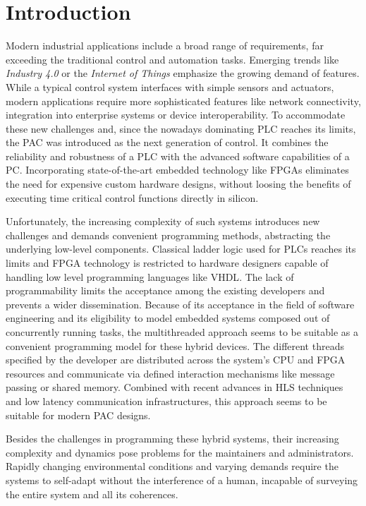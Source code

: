 \chapter{Introduction}

Modern industrial applications include a broad range of requirements, far
exceeding the traditional control and automation tasks. Emerging trends like
\emph{Industry 4.0} or the \emph{Internet of Things} emphasize the growing
demand of features. While a typical control system interfaces with simple
sensors and actuators, modern applications require more sophisticated features
like network connectivity, integration into enterprise systems or device
interoperability. To accommodate these new challenges and, since the nowadays
dominating \ac{PLC} reaches its limits, the \ac{PAC} was introduced as the
next generation of control. It combines the reliability and robustness of a
\ac{PLC} with the advanced software capabilities of a \ac{PC}. Incorporating
state-of-the-art embedded technology like \acp{FPGA} eliminates the need for
expensive custom hardware designs, without loosing the benefits of executing
time critical control functions directly in silicon.

Unfortunately, the increasing complexity of such systems introduces new
challenges and demands convenient programming methods, abstracting the
underlying low-level components. Classical ladder logic used for \acp{PLC}
reaches its limits and \ac{FPGA} technology is restricted to hardware
designers capable of handling low level programming languages like \ac{VHDL}.
The lack of programmability limits the acceptance among the existing
developers and prevents a wider dissemination. Because of its acceptance in
the field of software engineering and its eligibility to model embedded
systems composed out of concurrently running tasks, the multithreaded approach
seems to be suitable as a convenient programming model for these hybrid
devices. The different threads specified by the developer are distributed
across the system's \ac{CPU} and \ac{FPGA} resources and communicate via
defined interaction mechanisms like message passing or shared memory. Combined
with recent advances in \ac{HLS} techniques and low latency communication
infrastructures, this approach seems to be suitable for modern \ac{PAC}
designs.

Besides the challenges in programming these hybrid systems, their increasing
complexity and dynamics pose problems for the maintainers and administrators.
Rapidly changing environmental conditions and varying demands require the
systems to self-adapt without the interference of a human, incapable of
surveying the entire system and all its coherences.

